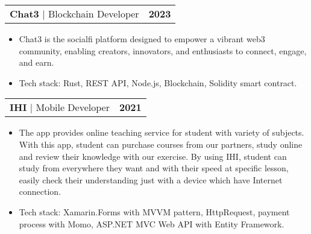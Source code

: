 \documentclass[letterpaper,11pt]{article}
\makeatletter
\newcommand{\resumeItem}[1]{
	\item\small{
		{#1 \vspace{-2pt}}
	}
}
\newcommand{\resumeProjectHeading}[2]{
	\item
	\begin{tabular*}{1.001\textwidth}{l@{\extracolsep{\fill}}r}
		\small#1 & \textbf{\small #2}\\
	\end{tabular*}\vspace{-7pt}
}
\newcommand{\resumeItemListStart}{\begin{itemize}}
\newcommand{\resumeItemListEnd}{\end{itemize}\vspace{-5pt}}
\makeatother
\begin{document}
\resumeProjectHeading
{\textbf{\large{Chat3}} $|$ \large{Blockchain Developer}}{2023}
\resumeItemListStart
\resumeItem{\normalsize{Chat3 is the socialfi platform designed to empower a
vibrant web3 community, enabling creators, innovators, and enthusiasts to
connect, engage, and earn.}}
\resumeItem{\normalsize{Tech stack: Rust, REST API, Node.js, Blockchain, Solidity smart contract.}}
\resumeItemListEnd
\vspace{-13pt}

\resumeProjectHeading
{\textbf{\large{IHI}} $|$ \large{Mobile Developer}}{2021}
\resumeItemListStart
\resumeItem{\normalsize{The app provides online teaching service for student with
		variety of subjects. With this app, student can purchase courses
		from our partners, study online and review their knowledge with
		our exercise. By using IHI, student can study from everywhere
		they want and with their speed at specific lesson, easily check
		their understanding just with a device which have Internet connection.}}
\resumeItem{\normalsize{Tech stack: Xamarin.Forms with MVVM pattern, HttpRequest, payment process
		with Momo, ASP.NET MVC Web API with Entity Framework.}}
\resumeItemListEnd
\vspace{-13pt}



\end{document}
